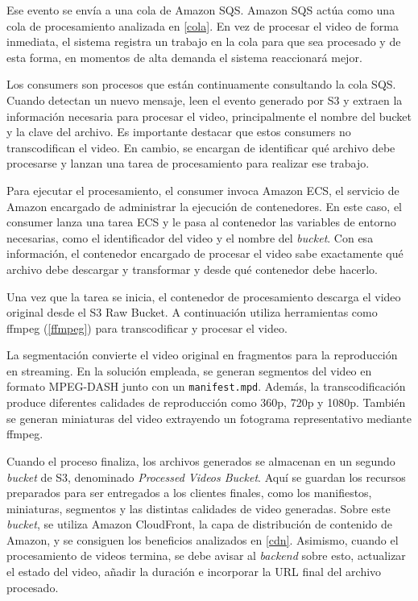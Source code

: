 Ese evento se envía a una cola de Amazon SQS. Amazon SQS actúa como una cola de procesamiento analizada en \ref{cola}. En vez de procesar el video de forma inmediata, el sistema registra un trabajo en la cola para que sea procesado y de esta forma, en momentos de alta demanda el sistema reaccionará mejor. 

Los consumers son procesos que están continuamente consultando la cola SQS. Cuando detectan un nuevo mensaje, leen el evento generado por S3 y extraen la información necesaria para procesar el video, principalmente el nombre del bucket y la clave del archivo. Es importante destacar que estos consumers no transcodifican el video. En cambio, se encargan de identificar qué archivo debe procesarse y lanzan una tarea de procesamiento para realizar ese trabajo.

Para ejecutar el procesamiento, el consumer invoca Amazon ECS, el servicio de Amazon encargado de administrar la ejecución de contenedores. En este caso, el consumer lanza una tarea ECS y le pasa al contenedor las variables de entorno necesarias, como el identificador del video y el nombre del \textit{bucket}. Con esa información, el contenedor encargado de procesar el video sabe exactamente qué archivo debe descargar y transformar y desde qué contenedor debe hacerlo.

Una vez que la tarea se inicia, el contenedor de procesamiento descarga el video original desde el S3 Raw Bucket. A continuación utiliza herramientas como ffmpeg (\ref{ffmpeg}) para transcodificar y procesar el video.

La segmentación convierte el video original en fragmentos para la reproducción en streaming. En la solución empleada, se generan segmentos del video en formato MPEG-DASH junto con un \texttt{manifest.mpd}. Además, la transcodificación produce diferentes calidades de reproducción como 360p, 720p y 1080p.  También se generan miniaturas del video extrayendo un fotograma representativo mediante ffmpeg.   

Cuando el proceso finaliza, los archivos generados se almacenan en un segundo \textit{bucket} de S3, denominado \textit{Processed Videos Bucket}. Aquí se guardan los recursos preparados para ser entregados a los clientes finales, como los manifiestos, miniaturas, segmentos y las distintas calidades de video generadas. Sobre este \textit{bucket}, se utiliza Amazon CloudFront, la capa de distribución de contenido de Amazon, y se consiguen los beneficios analizados en \ref{cdn}. Asimismo, cuando el procesamiento de videos termina, se debe avisar al \textit{backend} sobre esto, actualizar el estado del video, añadir la duración e incorporar la URL final del archivo procesado. 






